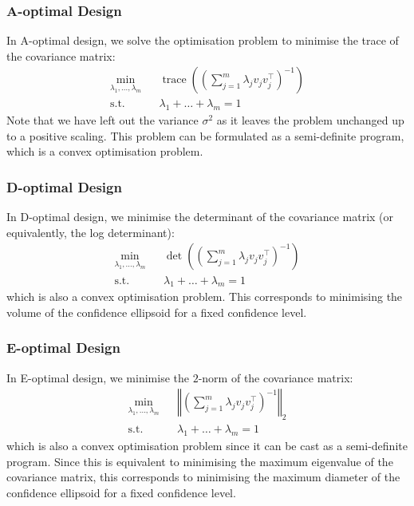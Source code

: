 \documentclass[11pt]{report} %
\begin{document}
\subsubsection{A-optimal Design}

In A-optimal design, we solve the optimisation problem to minimise the trace of the covariance matrix:
\begin{equation}
\begin{aligned}
\min_{\lambda_{1}, \dots, \lambda_{m}} & & \operatorname{trace}\left(\left(\sum_{j = 1}^{m}\lambda_{j}v_{j}v_{j}^{\top}\right)^{-1}\right) \\
\mathrm{s.t.} & & \lambda_{1} + \dots + \lambda_{m} = 1
\end{aligned}
\end{equation}
Note that we have left out the variance $\sigma^{2}$ as it leaves the problem unchanged up to a positive scaling. This problem can be formulated as a semi-definite program, which is a convex optimisation problem.

\subsubsection{D-optimal Design}

In D-optimal design, we minimise the determinant of the covariance matrix (or equivalently, the log determinant):
\begin{equation}
\begin{aligned}
\min_{\lambda_{1}, \dots, \lambda_{m}} & & \operatorname{det}\left(\left(\sum_{j = 1}^{m}\lambda_{j}v_{j}v_{j}^{\top}\right)^{-1}\right) \\
\mathrm{s.t.} & & \lambda_{1} + \dots + \lambda_{m} = 1
\end{aligned}
\end{equation}
which is also a convex optimisation problem. This corresponds to minimising the volume of the confidence ellipsoid for a fixed confidence level.

\subsubsection{E-optimal Design}

In E-optimal design, we minimise the $2$-norm of the covariance matrix:
\begin{equation}
\begin{aligned}
\min_{\lambda_{1}, \dots, \lambda_{m}} & & \left\Vert\left(\sum_{j = 1}^{m}\lambda_{j}v_{j}v_{j}^{\top}\right)^{-1}\right\Vert_{2} \\
\mathrm{s.t.} & & \lambda_{1} + \dots + \lambda_{m} = 1
\end{aligned}
\end{equation}
which is also a convex optimisation problem since it can be cast as a semi-definite program. Since this is equivalent to minimising the maximum eigenvalue of the covariance matrix, this corresponds to minimising the maximum diameter of the confidence ellipsoid for a fixed confidence level.
\end{document}
